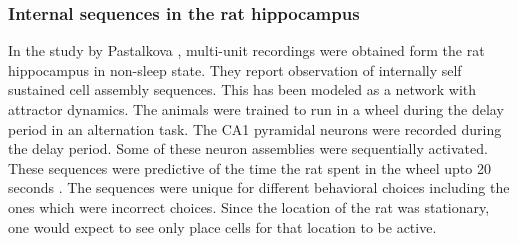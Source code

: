\subsubsection{Internal sequences in the rat hippocampus}
In the study by Pastalkova \cite{Pastalkova2008a}, multi-unit recordings were obtained form the rat hippocampus in non-sleep state. They report observation of internally self sustained cell assembly sequences. This has been modeled as a network with attractor dynamics. The animals were trained to run in a wheel during the delay period in an alternation task. The CA1 pyramidal neurons were recorded during the delay period. Some of these neuron assemblies were sequentially activated. These sequences were predictive of the time the rat spent in the wheel upto 20 seconds \cite{Itskov2011a}. The sequences were unique for different behavioral choices including the ones which were incorrect choices. Since the location of the rat was stationary, one would expect to see only place cells for that location to be active.  \\  
[time/distance cells]

